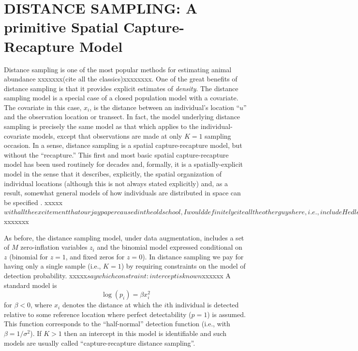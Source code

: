 \section{DISTANCE SAMPLING: A primitive Spatial Capture-Recapture Model}

Distance sampling is one of the most popular methods for estimating
animal abundance xxxxxxx(cite all the classics)xxxxxxxx. One of the great benefits of distance sampling is
that it provides explicit estimates of {\it density}. The distance
sampling model is a special case of a closed population model with a
covariate. The covariate in this case, $x_{i}$, is the distance
between an individual's location ``$u$'' and the observation location
or transect. In fact, the model underlying distance sampling is
precisely the same model as that which applies to the
individual-covariate models, except that observations are made at only
$K=1$ sampling occasion. In a sense, distance sampling is a spatial
capture-recapture model, but without the ``recapture.''  This first
and most basic spatial capture-recapture model has been used routinely
for decades and, formally, it is a spatially-explicit model in the
sense that it describes, explicitly, the spatial organization of
individual locations (although this is not always stated explicitly)
and, as a result, somewhat general models of how individuals are
distributed in space can be specified \citep{royle_etal:2004,
  johnson_etal:2010, sillett_etal:2011}. xxxxx$with all the excitement that our jay paper caused in the old school, I would definitely cite all the other guys here, i.e., include Hedley and Buckland 2004 and Niemi and Fernandez 2011 or whatever. Add these courtesy cites$xxxxxxx

As before, the distance sampling model, under data augmentation,
includes a set of $M$ zero-inflation variables $z_{i}$ and the
binomial model expressed conditional on $z$ (binomial for $z=1$, and
fixed zeros for $z=0$).  In distance sampling we pay for having only a
single sample (i.e., $K=1$) by requiring constraints on the model of
detection probability. xxxxx$say which constraint: intercept is known$xxxxxx A standard model is
\[
\log(p_{i}) = \beta x_{i}^{2}
\]
for $\beta < 0$, where $x_i$ denotes the distance at which the $i$th
individual is detected relative to some reference location where
perfect detectability ($p=1$) is assumed. This function corresponds to
the ``half-normal'' detection function (i.e., with $\beta =
1/\sigma^{2}$).  If $K>1$ then an intercept in this model is
identifiable and such models are usually called ``capture-recapture
distance sampling''\citep{alpizar_pollock:1996,borchers_etal:1998}.

